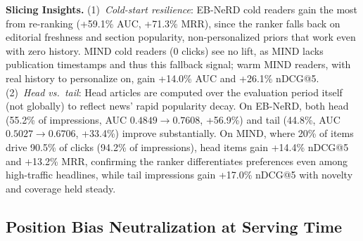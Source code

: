 \documentclass[11pt,a4paper]{article}
\begin{document}
\textbf{Slicing Insights.}
(1)~\textit{Cold-start resilience}: EB-NeRD cold readers gain the most from re-ranking (+59.1\% AUC, +71.3\% MRR), since the ranker falls back on editorial freshness and section popularity, non-personalized priors that work even with zero history. MIND cold readers ($0$ clicks) see no lift, as MIND lacks publication timestamps and thus this fallback signal; warm MIND readers, with real history to personalize on, gain +14.0\% AUC and +26.1\% nDCG@5.
(2)~\textit{Head vs.\ tail}: Head articles are computed over the evaluation period itself (not globally) to reflect news' rapid popularity decay. On EB-NeRD, both head (55.2\% of impressions, AUC $0.4849\to\mathbf{0.7608}$, +56.9\%) and tail (44.8\%, AUC $0.5027\to\mathbf{0.6706}$, +33.4\%) improve substantially. On MIND, where 20\% of items drive 90.5\% of clicks (94.2\% of impressions), head items gain +14.4\% nDCG@5 and +13.2\% MRR, confirming the ranker differentiates preferences even among high-traffic headlines, while tail impressions gain +17.0\% nDCG@5 with novelty and coverage held steady.

\subsection{Position Bias Neutralization at Serving Time}
\end{document}
